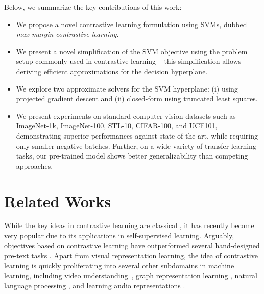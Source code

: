 \documentclass[letterpaper]{article} \usepackage{aaai22}  \usepackage{times}  \usepackage{helvet}  \usepackage{courier}  \usepackage[hyphens]{url}  \usepackage{graphicx} \urlstyle{rm} \def\UrlFont{\rm}  \usepackage{natbib}  \usepackage{caption} \DeclareCaptionStyle{ruled}{labelfont=normalfont,labelsep=colon,strut=off} \frenchspacing  \setlength{\pdfpagewidth}{8.5in}  \setlength{\pdfpageheight}{11in}
\begin{document}
Below, we summarize the key contributions of this work:
\begin{itemize}
    \item We propose a novel contrastive learning formulation using SVMs, dubbed \emph{max-margin contrastive learning}.
    \item We present a novel simplification of the SVM objective using the problem setup commonly used in contrastive learning -- this simplification allows deriving efficient approximations for the decision hyperplane.
    \item We explore two approximate solvers for the SVM hyperplane: (i) using projected gradient descent and (ii) closed-form using truncated least squares.
    \item We present experiments on standard computer vision datasets such as ImageNet-1k, ImageNet-100, STL-10, CIFAR-100, and UCF101, demonstrating superior performances against state of the art, while requiring only smaller negative batches. Further, on a wide variety of transfer learning tasks, our pre-trained model shows better generalizability than competing approaches. 
\end{itemize}

\section{Related Works}
While the key ideas in contrastive learning are  classical \cite{becker1992self,gutmann2010noise,hadsell2006dimensionality}, it has  recently become very popular due to its applications in self-supervised learning. Arguably, objectives based on contrastive learning have outperformed several hand-designed pre-text tasks \cite{doersch2015unsupervised,gidaris2018unsupervised,larsson2016learning,noroozi2016unsupervised,zhang2016colorful}.
Apart from visual representation learning, the idea of contrastive learning is quickly proliferating into several other subdomains in machine learning, including video understanding~\cite{NEURIPS2020_3def184a}, graph representation learning \cite{you2020graph,sun2020infograph}, natural language processing \cite{logeswaran2018an}, and learning audio representations \cite{saeed2020contrastive}. 
\end{document}

